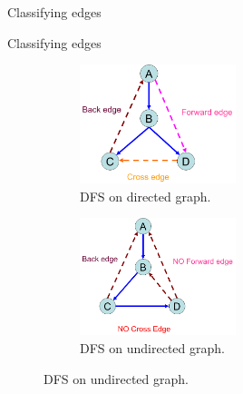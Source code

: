 \begin{frame}{Classifying edges}
  \begin{exampleblock}{Classifying edges }
    \begin{figure}
      \begin{subfigure}{0.50\linewidth}
	\centering
	\includegraphics[width=0.50\textwidth]{figures/dfs-digraph.png}
	\caption{DFS on directed graph.}
      \end{subfigure}%
      \begin{subfigure}{0.50\linewidth}
	\centering
	\includegraphics[width=0.50\textwidth]{figures/dfs-undirected.png}
	\caption{DFS on undirected graph.}
      \end{subfigure}


\end{figure}
\end{exampleblock}
\end{frame}
